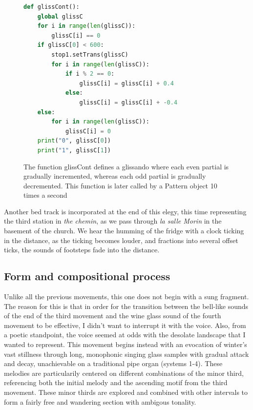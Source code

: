 \documentclass[12pt,twoside,maitrise]{dms_ks}
\theoremstyle{definition}
\begin{document}
{\begin{figure}[H]
\begin{lstlisting}[language=Python]
def glissCont():
    global glissC
    for i in range(len(glissC)):
        glissC[i] == 0
    if glissC[0] < 600:
        stop1.setTrans(glissC)
        for i in range(len(glissC)):
            if i % 2 == 0:
                glissC[i] = glissC[i] + 0.4
            else:
                glissC[i] = glissC[i] + -0.4
    else:
        for i in range(len(glissC)):
            glissC[i] = 0
    print("0", glissC[0])
    print("1", glissC[1])
\end{lstlisting}
\caption{The function glissCont defines a glissando where each even partial is gradually incremented, whereas each odd partial is gradually decremented. This function is later called by a Pattern object 10 times a second}
\end{figure}

Another bed track is incorporated at the end of this elegy, this time representing the third station in \textit{the chemin}, as we pass through \textit{la salle Morin} in the basement of the church. We hear the humming of the fridge with a clock ticking in the distance, as the ticking becomes louder, and fractions into several offset ticks, the sounds of footsteps fade into the distance.

\subsection{Form and compositional process}

Unlike all the previous movements, this one does not begin with a sung fragment. The reason for this is that in order for the transition between the bell-like sounds of the end of the third movement and the wine glass sound of the fourth movement to be effective, I didn't want to interrupt it with the voice. Also, from a poetic standpoint, the voice seemed at odds with the desolate landscape that I wanted to represent.
This movement begins instead with an evocation of winter's vast stillness through long, monophonic singing glass samples with gradual attack and decay, unachievable on a traditional pipe organ (systems 1-4).
These melodies are particularily centered on different combinations of the minor third, referencing both the initial melody and the ascending motif from the third movement.
These minor thirds are explored and combined with other intervals to form a fairly free and wandering section with ambigous tonality.

}
\end{document}
